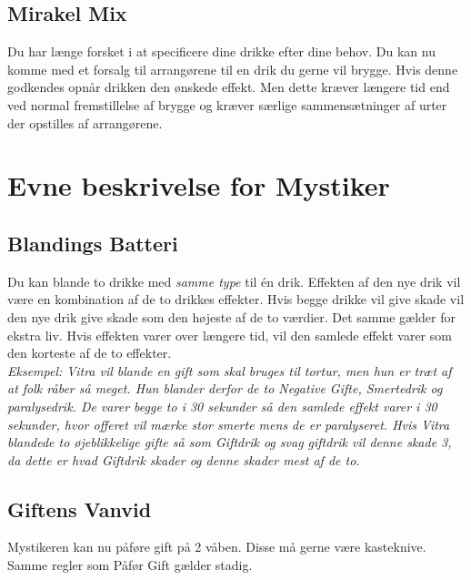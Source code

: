 

\subsection*{Mirakel Mix}
Du har længe forsket i at specificere dine drikke efter dine behov. Du kan nu komme med et forsalg til arrangørene til en drik du gerne vil brygge. Hvis denne godkendes opnår drikken den ønskede effekt. Men dette kræver længere tid end ved normal fremstillelse af brygge og kræver særlige sammensætninger af urter der opstilles af arrangørene.\\


\section*{Evne beskrivelse for Mystiker}

\subsection*{Blandings Batteri}
Du kan blande to drikke med \emph{samme type} til én drik. Effekten af den nye drik vil være en kombination af de to drikkes effekter. Hvis begge drikke vil give skade vil den nye drik give skade som den højeste af de to værdier. Det samme gælder for ekstra liv. Hvis effekten varer over længere tid, vil den samlede effekt varer som den korteste af de to effekter.\\
\textit{Eksempel: Vitra vil blande en gift som skal bruges til tortur, men hun er træt af at folk råber så meget. Hun blander derfor de to Negative Gifte, Smertedrik og paralysedrik. De varer begge to i 30 sekunder så den samlede effekt varer i 30 sekunder, hvor offeret vil mærke stor smerte mens de er paralyseret. Hvis Vitra blandede to øjeblikkelige gifte så som Giftdrik og svag giftdrik vil denne skade 3, da dette er hvad Giftdrik skader og denne skader mest af de to.}

\subsection*{Giftens Vanvid}
Mystikeren kan nu påføre gift på 2 våben. Disse må gerne være kasteknive. Samme regler som Påfør Gift gælder stadig.\\

